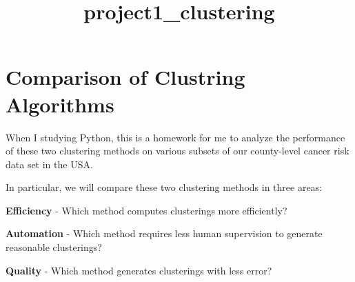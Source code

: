\documentclass[11pt]{article}
\title{project1\_clustering}
\begin{document}
    
    
    \maketitle
    
    

    
    \section{Comparison of Clustring
Algorithms}\label{comparison-of-clustring-algorithms}

    When I studying Python, this is a homework for me to analyze the
performance of these two clustering methods on various subsets of our
county-level cancer risk data set in the USA.

In particular, we will compare these two clustering methods in three
areas:

\textbf{Efficiency} - Which method computes clusterings more
efficiently?

\textbf{Automation} - Which method requires less human supervision to
generate reasonable clusterings?

\textbf{Quality} - Which method generates clusterings with less error?
\end{document}
